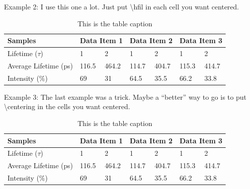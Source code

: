 Example 2:
I use this one a lot.  Just put \textbackslash hfil  in each cell you want centered.

\begin{table}[h]
	\centering
	\begin{tabular}[c]{|p{2.5cm}|p{1.5cm}|p{1.5cm}|p{1.5cm}|p{1.5cm}|p{1.5cm}|p{1.5cm}|} \hline
			Samples & \multicolumn{2}{|c|}{Data Item 1} & \multicolumn{2}{|c|}{Data Item 2} & \multicolumn{2}{|c|}{Data Item 3}\\ \hline
		Lifetime ($\tau$)     & \hfil 1     & \hfil 2     & \hfil 1     & \hfil 2     & \hfil 1     & \hfil 2 \\  \hline
		Average Lifetime (ps) & \hfil 116.5 & \hfil 464.2 & \hfil 114.7 & \hfil 404.7 & \hfil 115.3 & \hfil 414.7 \\ \hline
		Intensity (\%)        & \hfil 69    & \hfil 31    & \hfil 64.5  & \hfil 35.5  & \hfil 66.2  & \hfil 33.8 \\ \hline
	\end{tabular}
	\caption{This is the table caption}
	\label{OpenResults}
\end{table}

Example 3:
The last example was a trick.  Maybe a ``better'' way to go is to put \textbackslash centering in the cells you want centered.

\begin{table}[h]
	\centering
	\begin{tabular}[c]{|p{2.5cm}|p{1.5cm}|p{1.5cm}|p{1.5cm}|p{1.5cm}|p{1.5cm}|p{1.5cm}|} \hline
		Samples & \multicolumn{2}{|c|}{Data Item 1} & \multicolumn{2}{|c|}{Data Item 2} & \multicolumn{2}{|c|}{Data Item 3}\\ \hline
		Lifetime ($\tau$)      & 1     & 2     & 1     & 2     & 1     & 2     \\  \hline
		Average Lifetime (ps)  & 116.5 & 464.2 & 114.7 & 404.7 & 115.3 & 414.7 \\  \hline
		Intensity (\%)         & 69    & 31    & 64.5  & 35.5  & 66.2  & 33.8  \\  \hline
	\end{tabular}
	\caption{This is the table caption}
	\label{OpenResults}
\end{table}


